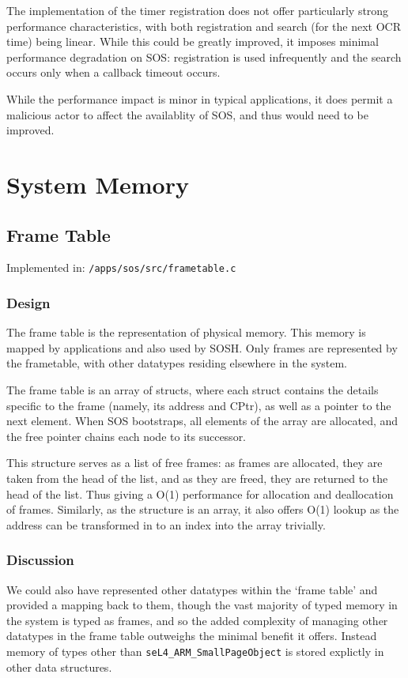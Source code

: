 \documentclass[a4paper,12pt]{article}
\begin{document}
The implementation of the timer registration does not offer particularly
strong performance characteristics, with both registration and search (for the
next OCR time) being linear.  While this could be greatly improved, it imposes
minimal performance degradation on SOS: registration is used infrequently and
the search occurs only when a callback timeout occurs.

While the performance impact is minor in typical applications, it does permit
a malicious actor to affect the availablity of SOS, and thus would need to be
improved.

\section{System Memory}
\subsection{Frame Table}
Implemented in: \texttt{/apps/sos/src/frametable.c}
\subsubsection{Design}
The frame table is the representation of physical memory. This memory is
mapped by applications and also used by SOSH.  Only frames are represented by
the frametable, with other datatypes residing elsewhere in the system.

The frame table is an array of structs, where each struct contains the details
specific to the frame (namely, its address and CPtr), as well as a pointer to
the next element.  When SOS bootstraps, all elements of the array are
allocated, and the free pointer chains each node to its successor.

This structure serves as a list of free frames: as frames are allocated, they
are taken from the head of the list, and as they are freed, they are returned
to the head of the list.  Thus giving a O(1) performance for allocation and
deallocation of frames.  Similarly, as the structure is an array, it also
offers O(1) lookup as the address can be transformed in to an index into the
array trivially.

\subsubsection{Discussion}
We could also have represented other datatypes within the `frame table' and
provided a mapping back to them, though the vast majority of typed memory in
the system is typed as frames, and so the added complexity of managing other
datatypes in the frame table outweighs the minimal benefit it offers.  Instead
memory of types other than \texttt{seL4\_ARM\_SmallPageObject} is stored
explictly in other data structures.
\end{document}
